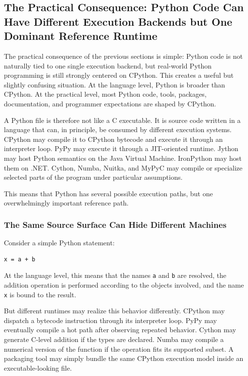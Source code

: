 \subsection{The Practical Consequence: Python Code Can Have Different Execution Backends but One Dominant Reference Runtime}

The practical consequence of the previous sections is simple: Python code is not naturally tied to one single execution backend, but real-world Python programming is still strongly centered on CPython. This creates a useful but slightly confusing situation. At the language level, Python is broader than CPython. At the practical level, most Python code, tools, packages, documentation, and programmer expectations are shaped by CPython.

A Python file is therefore not like a C executable. It is source code written in a language that can, in principle, be consumed by different execution systems. CPython may compile it to CPython bytecode and execute it through an interpreter loop. PyPy may execute it through a JIT-oriented runtime. Jython may host Python semantics on the Java Virtual Machine. IronPython may host them on .NET. Cython, Numba, Nuitka, and MyPyC may compile or specialize selected parts of the program under particular assumptions.

This means that Python has several possible execution paths, but one overwhelmingly important reference path.

\subsubsection{The Same Source Surface Can Hide Different Machines}

Consider a simple Python statement:

\begin{verbatim}
x = a + b
\end{verbatim}

At the language level, this means that the names \texttt{a} and \texttt{b} are resolved, the addition operation is performed according to the objects involved, and the name \texttt{x} is bound to the result.

But different runtimes may realize this behavior differently. CPython may dispatch a bytecode instruction through its interpreter loop. PyPy may eventually compile a hot path after observing repeated behavior. Cython may generate C-level addition if the types are declared. Numba may compile a numerical version of the function if the operation fits its supported subset. A packaging tool may simply bundle the same CPython execution model inside an executable-looking file.

